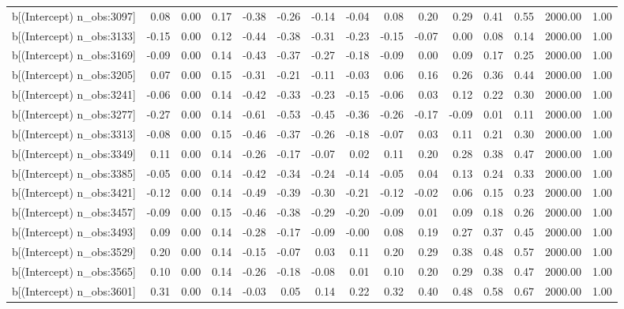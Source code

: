 \begin{table}[ht]
\begin{tabular}{rrrrrrrrrrrrrrr}
  b[(Intercept) n\_obs:3097] & 0.08 & 0.00 & 0.17 & -0.38 & -0.26 & -0.14 & -0.04 & 0.08 & 0.20 & 0.29 & 0.41 & 0.55 & 2000.00 & 1.00 \\ 
  b[(Intercept) n\_obs:3133] & -0.15 & 0.00 & 0.12 & -0.44 & -0.38 & -0.31 & -0.23 & -0.15 & -0.07 & 0.00 & 0.08 & 0.14 & 2000.00 & 1.00 \\ 
  b[(Intercept) n\_obs:3169] & -0.09 & 0.00 & 0.14 & -0.43 & -0.37 & -0.27 & -0.18 & -0.09 & 0.00 & 0.09 & 0.17 & 0.25 & 2000.00 & 1.00 \\ 
  b[(Intercept) n\_obs:3205] & 0.07 & 0.00 & 0.15 & -0.31 & -0.21 & -0.11 & -0.03 & 0.06 & 0.16 & 0.26 & 0.36 & 0.44 & 2000.00 & 1.00 \\ 
  b[(Intercept) n\_obs:3241] & -0.06 & 0.00 & 0.14 & -0.42 & -0.33 & -0.23 & -0.15 & -0.06 & 0.03 & 0.12 & 0.22 & 0.30 & 2000.00 & 1.00 \\ 
  b[(Intercept) n\_obs:3277] & -0.27 & 0.00 & 0.14 & -0.61 & -0.53 & -0.45 & -0.36 & -0.26 & -0.17 & -0.09 & 0.01 & 0.11 & 2000.00 & 1.00 \\ 
  b[(Intercept) n\_obs:3313] & -0.08 & 0.00 & 0.15 & -0.46 & -0.37 & -0.26 & -0.18 & -0.07 & 0.03 & 0.11 & 0.21 & 0.30 & 2000.00 & 1.00 \\ 
  b[(Intercept) n\_obs:3349] & 0.11 & 0.00 & 0.14 & -0.26 & -0.17 & -0.07 & 0.02 & 0.11 & 0.20 & 0.28 & 0.38 & 0.47 & 2000.00 & 1.00 \\ 
  b[(Intercept) n\_obs:3385] & -0.05 & 0.00 & 0.14 & -0.42 & -0.34 & -0.24 & -0.14 & -0.05 & 0.04 & 0.13 & 0.24 & 0.33 & 2000.00 & 1.00 \\ 
  b[(Intercept) n\_obs:3421] & -0.12 & 0.00 & 0.14 & -0.49 & -0.39 & -0.30 & -0.21 & -0.12 & -0.02 & 0.06 & 0.15 & 0.23 & 2000.00 & 1.00 \\ 
  b[(Intercept) n\_obs:3457] & -0.09 & 0.00 & 0.15 & -0.46 & -0.38 & -0.29 & -0.20 & -0.09 & 0.01 & 0.09 & 0.18 & 0.26 & 2000.00 & 1.00 \\ 
  b[(Intercept) n\_obs:3493] & 0.09 & 0.00 & 0.14 & -0.28 & -0.17 & -0.09 & -0.00 & 0.08 & 0.19 & 0.27 & 0.37 & 0.45 & 2000.00 & 1.00 \\ 
  b[(Intercept) n\_obs:3529] & 0.20 & 0.00 & 0.14 & -0.15 & -0.07 & 0.03 & 0.11 & 0.20 & 0.29 & 0.38 & 0.48 & 0.57 & 2000.00 & 1.00 \\ 
  b[(Intercept) n\_obs:3565] & 0.10 & 0.00 & 0.14 & -0.26 & -0.18 & -0.08 & 0.01 & 0.10 & 0.20 & 0.29 & 0.38 & 0.47 & 2000.00 & 1.00 \\ 
  b[(Intercept) n\_obs:3601] & 0.31 & 0.00 & 0.14 & -0.03 & 0.05 & 0.14 & 0.22 & 0.32 & 0.40 & 0.48 & 0.58 & 0.67 & 2000.00 & 1.00 \\ 

\end{tabular}
\end{table}
